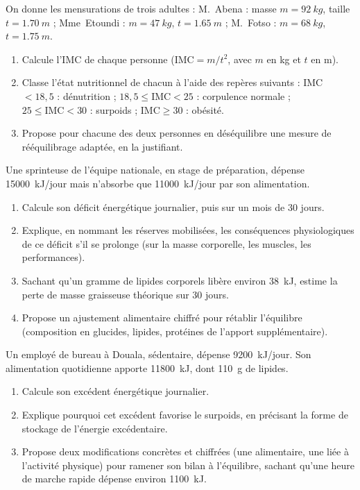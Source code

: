 \documentclass[11pt]{article}
\begin{document}
\begin{exercice}
On donne les mensurations de trois adultes : M.~Abena : masse $m = \SI{92}{kg}$, taille $t = \SI{1,70}{m}$ ; Mme~Etoundi : $m = \SI{47}{kg}$, $t = \SI{1,65}{m}$ ; M.~Fotso : $m = \SI{68}{kg}$, $t = \SI{1,75}{m}$.
\begin{enumerate}
\item Calcule l'IMC de chaque personne ($\mathrm{IMC} = m/t^{2}$, avec $m$ en kg et $t$ en m).
\item Classe l'état nutritionnel de chacun à l'aide des repères suivants : IMC $< 18,5$ : dénutrition ; $18,5 \leq \mathrm{IMC} < 25$ : corpulence normale ; $25 \leq \mathrm{IMC} < 30$ : surpoids ; $\mathrm{IMC} \geq 30$ : obésité.
\item Propose pour chacune des deux personnes en déséquilibre une mesure de rééquilibrage adaptée, en la justifiant.
\end{enumerate}
\end{exercice}

\begin{exercice}
Une sprinteuse de l'équipe nationale, en stage de préparation, dépense \SI{15000}{kJ/jour} mais n'absorbe que \SI{11000}{kJ/jour} par son alimentation.
\begin{enumerate}
\item Calcule son déficit énergétique journalier, puis sur un mois de 30 jours.
\item Explique, en nommant les réserves mobilisées, les conséquences physiologiques de ce déficit s'il se prolonge (sur la masse corporelle, les muscles, les performances).
\item Sachant qu'un gramme de lipides corporels libère environ \SI{38}{kJ}, estime la perte de masse graisseuse théorique sur 30 jours.
\item Propose un ajustement alimentaire chiffré pour rétablir l'équilibre (composition en glucides, lipides, protéines de l'apport supplémentaire).
\end{enumerate}
\end{exercice}

\begin{exercice}
Un employé de bureau à Douala, sédentaire, dépense \SI{9200}{kJ/jour}. Son alimentation quotidienne apporte \SI{11800}{kJ}, dont \SI{110}{g} de lipides.
\begin{enumerate}
\item Calcule son excédent énergétique journalier.
\item Explique pourquoi cet excédent favorise le surpoids, en précisant la forme de stockage de l'énergie excédentaire.
\item Propose deux modifications concrètes et chiffrées (une alimentaire, une liée à l'activité physique) pour ramener son bilan à l'équilibre, sachant qu'une heure de marche rapide dépense environ \SI{1100}{kJ}.
\end{enumerate}
\end{exercice}
\end{document}
